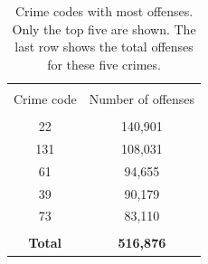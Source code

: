 \documentclass[11pt, english]{article}
\begin{document}
\begin{multicols}{2}
\begin{table}
\end{table}

\begin{table}
	\caption{Crime codes with most offenses. Only the top five are shown. The last row shows the total offenses for these five crimes.}
	\label{tab:notorious-crimes}
	\centering
	\begin{tabular}{cc}
		\hline\hline
		\\[-1.5ex]
		Crime code		&	Number of offenses	\\[0.5ex]\hline
		\\[-1.5ex]
		22				&	140,901	\\[0.2ex]
		131				&	108,031				\\[0.2ex]
		61				&	\hspace{1ex}94,655	\\[0.2ex]
		39				&	\hspace{1ex}90,179	\\[0.2ex]
		73				&	\hspace{1ex}83,110	\\[0.2ex]\hline
		\\[-2ex]
		\textbf{Total}	&	\textbf{516,876}	\\[0.5ex]
		\hline\hline
	\end{tabular}

\end{table}


\end{multicols}
\end{document}
